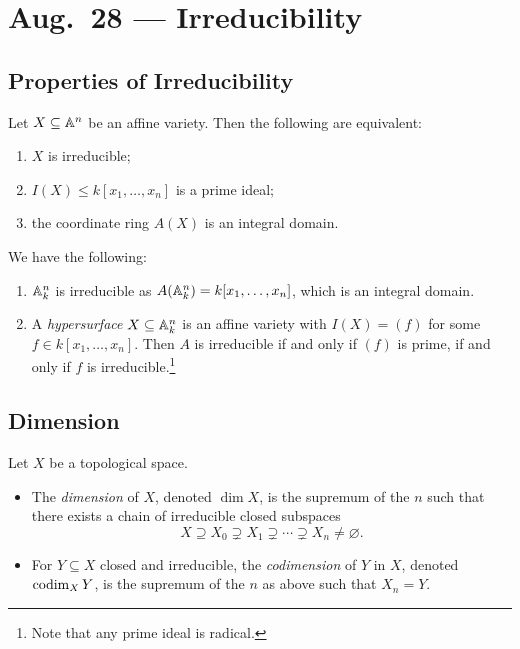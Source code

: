 \chapter{Aug.~28 --- Irreducibility}

\section{Properties of Irreducibility}
\begin{prop}
  Let $X \subseteq \mathbb{A}^n$ be an
  affine variety. Then the following are equivalent:
  \begin{enumerate}
    \item $X$ is irreducible;
    \item $I(X) \le k[x_1, \dots, x_n]$
      is a prime ideal;
    \item the coordinate ring $A(X)$
      is an integral domain.
  \end{enumerate}
\end{prop}

\begin{example}
  We have the following:
  \begin{enumerate}
    \item $\mathbb{A}_k^n$ is irreducible
      as $A(\mathbb{A}_k^n) = k[x_1, \dots, x_n]$,
      which is an integral domain.
    \item A \emph{hypersurface}
      $X \subseteq \mathbb{A}_k^n$ is
      an affine variety with $I(X) = (f)$
      for some $f \in k[x_1, \dots, x_n]$.
      Then $A$ is irreducible if and only
      if $(f)$ is prime, if and only if
      $f$ is irreducible.\footnote{Note that any prime ideal is radical.}
  \end{enumerate}
\end{example}

\section{Dimension}
\begin{definition}
  Let $X$ be a topological space.
  \begin{itemize}
    \item The \emph{dimension} of $X$,
      denoted $\dim X$, is the supremum of
      the $n$ such that there exists a
      chain of irreducible closed subspaces
      \[X \supseteq X_0 \supsetneq X_1 \supsetneq \cdots \supsetneq X_n \ne \varnothing.\]
    \item For $Y \subseteq X$ closed
      and irreducible, the
      \emph{codimension} of $Y$ in $X$,
      denoted $\operatorname{codim}_X Y$, is the supremum
      of the $n$ as above such that
      $X_n = Y$.
  \end{itemize}
\end{definition}

